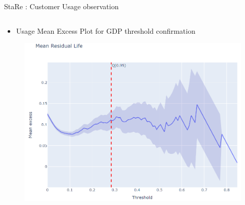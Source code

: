 \documentclass{renault-template}
\begin{document}
\begin{frame}{StaRe : Customer Usage observation}
\begin{center}
\begin{columns}[t]
      \begin{column}{0.35\textwidth}
        \begin{itemize}
        \item Usage Mean Excess Plot for GDP threshold confirmation
        \end{itemize}
        \begin{figure}
          \includegraphics[height=0.44\textheight]{Illustration_StaRe/MRL.png}
        \end{figure}
      \end{column}
    \end{columns}
  \end{center}
\end{frame}
\end{document}
